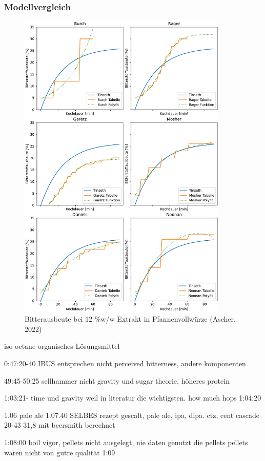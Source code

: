 \documentclass[a4paper,parskip=half]{scrartcl}
\begin{document}
\subsubsection*{Modellvergleich}

\begin{figure}[H]
\centering
\includegraphics[width=10cm]{graph_utilization.pdf}
\caption{Bitterausbeute bei 12 \%w/w Extrakt in Pfannenvollwürze (Ascher, 2022)}
\label{fig:novotnygraph}
\end{figure}

iso octane organisches Lösungsmittel

0:47:20-40
IBUS entsprechen nicht perceived bitterness, andere komponenten

49:45-50:25
sellhammer nicht gravity und sugar theorie, höheres protein

1:03:21- time und gravity weil in literatur
die wichtigsten. how much hops 1:04:20

1.06 pale ale 1.07.40
SELBES rezept gescalt, pale ale, ipa, dipa. ctz, cent cascade
20-43 31,8 mit beersmith berechnet

1:08:00 boil vigor, pellets nicht ausgelegt, nie daten genutzt die pellets
pellets waren nicht von gutre qualität 1:09
\end{document}
